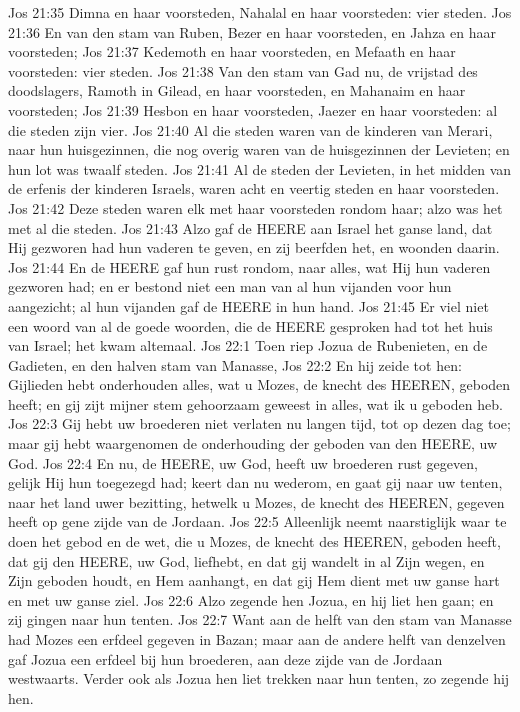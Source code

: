 Jos 21:35  Dimna en haar voorsteden, Nahalal en haar voorsteden: vier steden.
Jos 21:36  En van den stam van Ruben, Bezer en haar voorsteden, en Jahza en haar voorsteden;
Jos 21:37  Kedemoth en haar voorsteden, en Mefaath en haar voorsteden: vier steden.
Jos 21:38  Van den stam van Gad nu, de vrijstad des doodslagers, Ramoth in Gilead, en haar voorsteden, en Mahanaim en haar voorsteden;
Jos 21:39  Hesbon en haar voorsteden, Jaezer en haar voorsteden: al die steden zijn vier.
Jos 21:40  Al die steden waren van de kinderen van Merari, naar hun huisgezinnen, die nog overig waren van de huisgezinnen der Levieten; en hun lot was twaalf steden.
Jos 21:41  Al de steden der Levieten, in het midden van de erfenis der kinderen Israels, waren acht en veertig steden en haar voorsteden.
Jos 21:42  Deze steden waren elk met haar voorsteden rondom haar; alzo was het met al die steden.
Jos 21:43  Alzo gaf de HEERE aan Israel het ganse land, dat Hij gezworen had hun vaderen te geven, en zij beerfden het, en woonden daarin.
Jos 21:44  En de HEERE gaf hun rust rondom, naar alles, wat Hij hun vaderen gezworen had; en er bestond niet een man van al hun vijanden voor hun aangezicht; al hun vijanden gaf de HEERE in hun hand.
Jos 21:45  Er viel niet een woord van al de goede woorden, die de HEERE gesproken had tot het huis van Israel; het kwam altemaal.
Jos 22:1  Toen riep Jozua de Rubenieten, en de Gadieten, en den halven stam van Manasse,
Jos 22:2  En hij zeide tot hen: Gijlieden hebt onderhouden alles, wat u Mozes, de knecht des HEEREN, geboden heeft; en gij zijt mijner stem gehoorzaam geweest in alles, wat ik u geboden heb.
Jos 22:3  Gij hebt uw broederen niet verlaten nu langen tijd, tot op dezen dag toe; maar gij hebt waargenomen de onderhouding der geboden van den HEERE, uw God.
Jos 22:4  En nu, de HEERE, uw God, heeft uw broederen rust gegeven, gelijk Hij hun toegezegd had; keert dan nu wederom, en gaat gij naar uw tenten, naar het land uwer bezitting, hetwelk u Mozes, de knecht des HEEREN, gegeven heeft op gene zijde van de Jordaan.
Jos 22:5  Alleenlijk neemt naarstiglijk waar te doen het gebod en de wet, die u Mozes, de knecht des HEEREN, geboden heeft, dat gij den HEERE, uw God, liefhebt, en dat gij wandelt in al Zijn wegen, en Zijn geboden houdt, en Hem aanhangt, en dat gij Hem dient met uw ganse hart en met uw ganse ziel.
Jos 22:6  Alzo zegende hen Jozua, en hij liet hen gaan; en zij gingen naar hun tenten.
Jos 22:7  Want aan de helft van den stam van Manasse had Mozes een erfdeel gegeven in Bazan; maar aan de andere helft van denzelven gaf Jozua een erfdeel bij hun broederen, aan deze zijde van de Jordaan westwaarts. Verder ook als Jozua hen liet trekken naar hun tenten, zo zegende hij hen.
